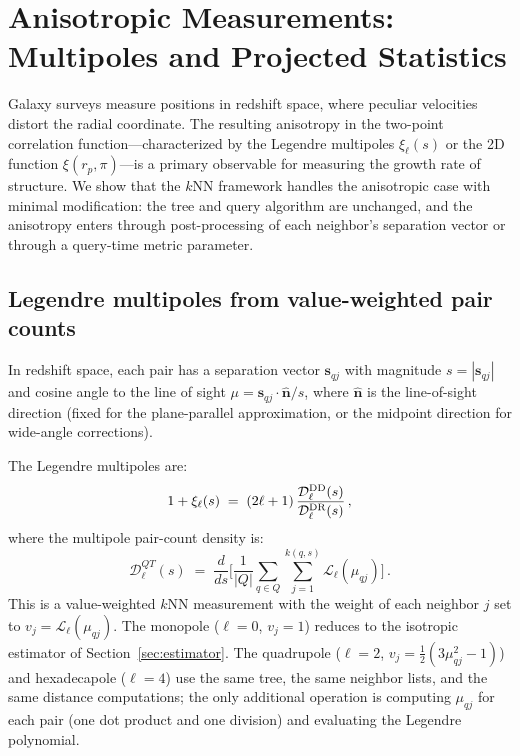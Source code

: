 \section{Anisotropic Measurements: Multipoles and Projected Statistics}
\label{sec:anisotropic}

Galaxy surveys measure positions in redshift space, where peculiar velocities distort the radial coordinate.  The resulting anisotropy in the two-point correlation function---characterized by the Legendre multipoles $\xi_\ell(s)$ or the 2D function $\xi(r_p, \pi)$---is a primary observable for measuring the growth rate of structure.  We show that the $k$NN framework handles the anisotropic case with minimal modification: the tree and query algorithm are unchanged, and the anisotropy enters through post-processing of each neighbor's separation vector or through a query-time metric parameter.

\subsection{Legendre multipoles from value-weighted pair counts}
\label{sec:multipoles_detail}

In redshift space, each pair has a separation vector $\mathbf{s}_{qj}$ with magnitude $s = |\mathbf{s}_{qj}|$ and cosine angle to the line of sight $\mu = \mathbf{s}_{qj}\cdot\hat{\mathbf{n}} / s$, where $\hat{\mathbf{n}}$ is the line-of-sight direction (fixed for the plane-parallel approximation, or the midpoint direction for wide-angle corrections).

The Legendre multipoles are:
\begin{equation}
  1 + \xi_\ell(s) \;=\; (2\ell+1)\,\frac{\mathcal{D}^{\mathrm{DD}}_\ell(s)}{\mathcal{D}^{\mathrm{DR}}_\ell(s)}\,,
  \label{eq:xi_ell}
\end{equation}
where the multipole pair-count density is:
\begin{equation}
  \mathcal{D}^{QT}_\ell(s) \;=\; \frac{d}{ds}\Biggl[\frac{1}{|Q|}\sum_{q \in Q}\sum_{j=1}^{k(q,s)} \mathcal{L}_\ell(\mu_{qj})\Biggr]\,.
  \label{eq:D_ell}
\end{equation}
This is a value-weighted $k$NN measurement with the weight of each neighbor $j$ set to $v_j = \mathcal{L}_\ell(\mu_{qj})$.  The monopole ($\ell = 0$, $v_j = 1$) reduces to the isotropic estimator of Section~\ref{sec:estimator}.  The quadrupole ($\ell = 2$, $v_j = \frac{1}{2}(3\mu_{qj}^2 - 1)$) and hexadecapole ($\ell = 4$) use the same tree, the same neighbor lists, and the same distance computations; the only additional operation is computing $\mu_{qj}$ for each pair (one dot product and one division) and evaluating the Legendre polynomial.


